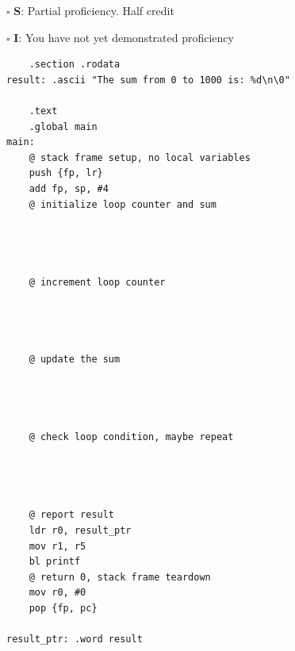 \documentclass[12pt]{article}
\begin{document}
$\square$ \textbf{S}: Partial proficiency. Half credit

$\square$ \textbf{I}: You have not yet demonstrated proficiency

\newpage

\begin{verbatim}
    .section .rodata
result: .ascii "The sum from 0 to 1000 is: %d\n\0"

    .text
    .global main
main: 
    @ stack frame setup, no local variables
    push {fp, lr}
    add fp, sp, #4
    @ initialize loop counter and sum




    @ increment loop counter



    
    @ update the sum


    
    
    @ check loop condition, maybe repeat



    
    @ report result
    ldr r0, result_ptr
    mov r1, r5
    bl printf
    @ return 0, stack frame teardown
    mov r0, #0
    pop {fp, pc}

result_ptr: .word result
\end{verbatim}

\end{document}
